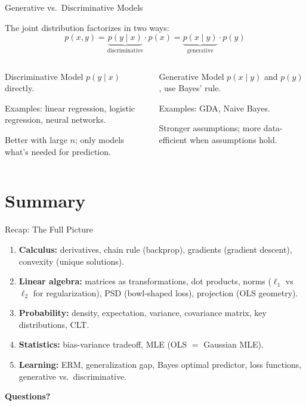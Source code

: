 \documentclass[aspectratio=169, professionalfonts]{beamer}
\begin{document}
\begin{frame}{Generative vs.\ Discriminative Models}

The joint distribution factorizes in two ways:
$$p(x, y) = \underbrace{p(y \mid x)}_{\text{discriminative}} \cdot p(x) = \underbrace{p(x \mid y)}_{\text{generative}} \cdot p(y)$$

\bigskip

\begin{columns}[t]
\begin{block}{Discriminative}
Model $p(y \mid x)$ directly.

\smallskip
Examples: linear regression, logistic regression, neural networks.

\smallskip
Better with large $n$; only models what's needed for prediction.
\end{block}

\begin{block}{Generative}
Model $p(x \mid y)$ and $p(y)$, use Bayes' rule.

\smallskip
Examples: GDA, Naive Bayes.

\smallskip
Stronger assumptions; more data-efficient when assumptions hold.
\end{block}
\end{columns}

\end{frame}

\section{Summary}

\begin{frame}{Recap: The Full Picture}

\begin{enumerate}
  \item \textbf{Calculus:} derivatives, chain rule (backprop), gradients (gradient descent), convexity (unique solutions).
  \item \textbf{Linear algebra:} matrices as transformations, dot products, norms ($\ell_1$ vs $\ell_2$ for regularization), PSD (bowl-shaped loss), projection (OLS geometry).
  \item \textbf{Probability:} density, expectation, variance, covariance matrix, key distributions, CLT.
  \item \textbf{Statistics:} bias-variance tradeoff, MLE (OLS $=$ Gaussian MLE).
  \item \textbf{Learning:} ERM, generalization gap, Bayes optimal predictor, loss functions, generative vs.\ discriminative.
\end{enumerate}

\end{frame}

{
\begin{frame}[c]
\centering
\Huge\textbf{Questions?}
\end{frame}
}
\end{document}
